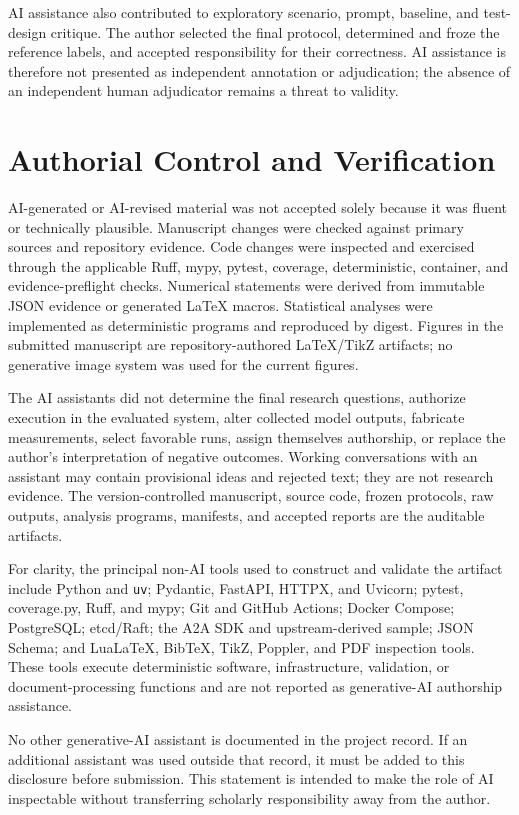 AI assistance also contributed to exploratory scenario, prompt, baseline, and test-design critique. The author selected the final protocol, determined and froze the reference labels, and accepted responsibility for their correctness. AI assistance is therefore not presented as independent annotation or adjudication; the absence of an independent human adjudicator remains a threat to validity.

\section{Authorial Control and Verification}

AI-generated or AI-revised material was not accepted solely because it was fluent or technically plausible. Manuscript changes were checked against primary sources and repository evidence. Code changes were inspected and exercised through the applicable Ruff, mypy, pytest, coverage, deterministic, container, and evidence-preflight checks. Numerical statements were derived from immutable JSON evidence or generated LaTeX macros. Statistical analyses were implemented as deterministic programs and reproduced by digest. Figures in the submitted manuscript are repository-authored LaTeX/TikZ artifacts; no generative image system was used for the current figures.

The AI assistants did not determine the final research questions, authorize execution in the evaluated system, alter collected model outputs, fabricate measurements, select favorable runs, assign themselves authorship, or replace the author's interpretation of negative outcomes. Working conversations with an assistant may contain provisional ideas and rejected text; they are not research evidence. The version-controlled manuscript, source code, frozen protocols, raw outputs, analysis programs, manifests, and accepted reports are the auditable artifacts.

For clarity, the principal non-AI tools used to construct and validate the artifact include Python and \texttt{uv}; Pydantic, FastAPI, HTTPX, and Uvicorn; pytest, coverage.py, Ruff, and mypy; Git and GitHub Actions; Docker Compose; PostgreSQL; etcd/Raft; the A2A SDK and upstream-derived sample; JSON Schema; and LuaLaTeX, BibTeX, TikZ, Poppler, and PDF inspection tools. These tools execute deterministic software, infrastructure, validation, or document-processing functions and are not reported as generative-AI authorship assistance.

No other generative-AI assistant is documented in the project record. If an additional assistant was used outside that record, it must be added to this disclosure before submission. This statement is intended to make the role of AI inspectable without transferring scholarly responsibility away from the author.
